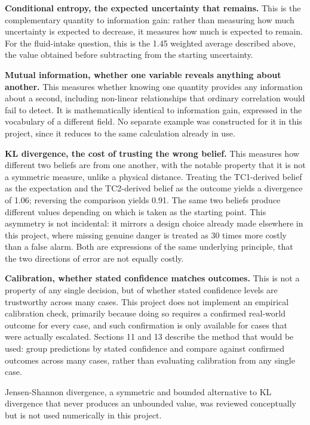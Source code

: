 \documentclass{article}
\begin{document}
\textbf{Conditional entropy, the expected uncertainty that remains.}
This is the complementary quantity to information gain: rather than
measuring how much uncertainty is expected to decrease, it measures how
much is expected to remain. For the fluid-intake question, this is the
1.45 weighted average described above, the value obtained before
subtracting from the starting uncertainty.

\textbf{Mutual information, whether one variable reveals anything about
another.} This measures whether knowing one quantity provides any
information about a second, including non-linear relationships that
ordinary correlation would fail to detect. It is mathematically
identical to information gain, expressed in the vocabulary of a
different field. No separate example was constructed for it in this
project, since it reduces to the same calculation already in use.

\textbf{KL divergence, the cost of trusting the wrong belief.} This
measures how different two beliefs are from one another, with the
notable property that it is not a symmetric measure, unlike a physical
distance. Treating the TC1-derived belief as the expectation and the
TC2-derived belief as the outcome yields a divergence of 1.06; reversing
the comparison yields 0.91. The same two beliefs produce different
values depending on which is taken as the starting point. This asymmetry
is not incidental: it mirrors a design choice already made elsewhere in
this project, where missing genuine danger is treated as 30 times more
costly than a false alarm. Both are expressions of the same underlying
principle, that the two directions of error are not equally costly.

\textbf{Calibration, whether stated confidence matches outcomes.} This
is not a property of any single decision, but of whether stated
confidence levels are trustworthy across many cases. This project does
not implement an empirical calibration check, primarily because doing so
requires a confirmed real-world outcome for every case, and such
confirmation is only available for cases that were actually escalated.
Sections 11 and 13 describe the method that would be used: group
predictions by stated confidence and compare against confirmed outcomes
across many cases, rather than evaluating calibration from any single
case.

Jensen-Shannon divergence, a symmetric and bounded alternative to KL
divergence that never produces an unbounded value, was reviewed
conceptually but is not used numerically in this project.
\end{document}
